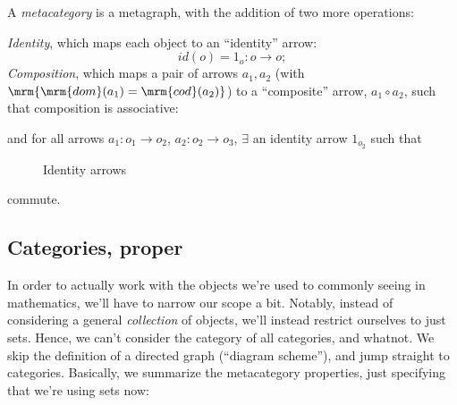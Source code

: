 \documentclass{fkbook}
\theoremstyle{snazzydefinition}
\renewcommand{\dom}{\mrm{dom}}
\renewcommand{\cod}{\mrm{cod}}
\begin{document}
\begin{definition}[Metacategory]
  A \emph{metacategory} is a metagraph, with the addition of two more
  operations:

  \emph{Identity}, which maps each object to an ``identity'' arrow:
  \[
    id(o) = 1_o : o \to o;
  \]
  \emph{Composition}, which maps a pair of arrows $a_1, a_2$ (with
  $\mrm{\dom(a_1) = \cod(a_2)}$) to a ``composite'' arrow, $a_1 \circ
  a_2$, such that composition is associative:
  \begin{figure}[H]
    \centering
  \end{figure}
  and for all arrows $a_1
  : o_1 \to o_2$, $a_2 : o_2 \to o_3$, $\exists$ an identity arrow
  $1_{o_2}$ such that
  \begin{figure}[H]
    \centering
    \begin{minipage}{.49\linewidth}
      \centering
    \end{minipage}
    \begin{minipage}{.49\linewidth}
      \centering
    \end{minipage}
    \caption{Identity arrows}
  \end{figure}
  commute.
\end{definition}

\subsection{Categories, proper}
In order to actually work with the objects we're used to commonly
seeing in mathematics, we'll have to narrow our scope a bit. Notably,
instead of considering a general \emph{collection} of objects, we'll
instead restrict ourselves to just sets. Hence, we can't consider the
category of all categories, and whatnot. We skip the definition of a
directed graph (``diagram scheme''), and jump straight to categories.
Basically, we summarize the metacategory properties, just specifying
that we're using sets now:
\end{document}
